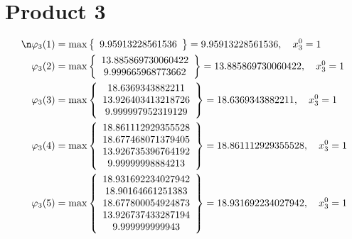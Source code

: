 \documentclass{article}
\begin{document}
\section{Product 3}
\begin{align*}
\n  
  
\varphi_{3}(1) &= \max \left\{ \begin{array}{c}
9.95913228561536
\end{array} \right\} = 9.95913228561536, \quad x_{3}^0 = 1\\
  
  
  
  
\varphi_{3}(2) &= \max \left\{ \begin{array}{c}
13.885869730060422 \\
 9.999665968773662
\end{array} \right\} = 13.885869730060422, \quad x_{3}^0 = 1\\
  
  
  
  
\varphi_{3}(3) &= \max \left\{ \begin{array}{c}
18.6369343882211 \\
 13.926403413218726 \\
 9.999997952319129
\end{array} \right\} = 18.6369343882211, \quad x_{3}^0 = 1\\
  
  
  
  
\varphi_{3}(4) &= \max \left\{ \begin{array}{c}
18.861112929355528 \\
 18.677468071379405 \\
 13.926735396764192 \\
 9.99999998884213
\end{array} \right\} = 18.861112929355528, \quad x_{3}^0 = 1\\
  
  
  
  
\varphi_{3}(5) &= \max \left\{ \begin{array}{c}
18.931692234027942 \\
 18.90164661251383 \\
 18.677800054924873 \\
 13.926737433287194 \\
 9.999999999943
\end{array} \right\} = 18.931692234027942, \quad x_{3}^0 = 1\\
  
  
  

\end{align*}
\end{document}
